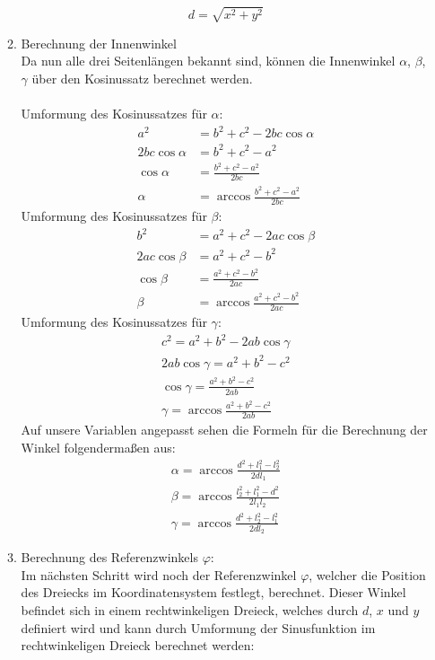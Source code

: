 \begin{itemize}
\begin{enumerate}
\begin{equation*}
d = \sqrt{x^2 + y^2}
\end{equation*}
\newpage
\item Berechnung der Innenwinkel\\
Da nun alle drei Seitenlängen bekannt sind, können die Innenwinkel $\alpha$, $\beta$, $\gamma$ über den Kosinussatz berechnet werden.\\
\\
Umformung des Kosinussatzes für $\alpha$:
\begin{align*}
a^2 & = b^2 + c^2 - 2bc \cos \alpha \\
2bc \cos \alpha & = b^2 + c^2 - a^2 \\
\cos \alpha & = \frac{b^2 + c^2 - a^2}{2bc} \\
\alpha & = \arccos \frac{b^2 + c^2 - a^2}{2bc}
\end{align*}
Umformung des Kosinussatzes für $\beta$:
\begin{align*}
b^2 & = a^2 + c^2 - 2ac \cos \beta \\
2ac \cos \beta & = a^2 + c^2 - b^2 \\
\cos \beta & = \frac{a^2 + c^2 - b^2}{2ac} \\
\beta & = \arccos \frac{a^2 + c^2 - b^2}{2ac}
\end{align*}
Umformung des Kosinussatzes für $\gamma$:
\begin{align*}
c^2 = a^2 + b^2 - 2ab \cos \gamma \\
2ab \cos \gamma = a^2 + b^2 - c^2 \\
\cos \gamma = \frac{a^2 + b^2 - c^2}{2ab} \\
\gamma = \arccos \frac{a^2 + b^2 - c^2}{2ab}
\end{align*}
Auf unsere Variablen angepasst sehen die Formeln für die Berechnung der Winkel folgendermaßen aus:
\begin{align*}
\alpha = \arccos \frac{d^2 + l_1^2 - l_2^2}{2dl_1} \\
\beta = \arccos \frac{l_2^2 + l_1^2 - d^2}{2l_1l_2} \\
\gamma = \arccos \frac{d^2 + l_2^2 - l_1^2}{2dl_2}
\end{align*}
\newpage
\item Berechnung des Referenzwinkels $\varphi$:\\
Im nächsten Schritt wird noch der Referenzwinkel $\varphi$, welcher die Position des Dreiecks im Koordinatensystem festlegt, berechnet. Dieser Winkel befindet sich in einem rechtwinkeligen Dreieck, welches durch $d$, $x$ und $y$ definiert wird und kann durch Umformung der Sinusfunktion im rechtwinkeligen Dreieck berechnet werden:

\end{enumerate}
\end{itemize}
